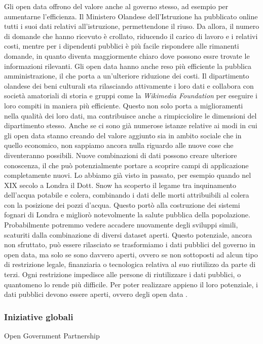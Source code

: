 Gli open data offrono del valore anche al governo stesso, ad esempio per aumentarne l'efficienza. Il Ministero Olandese dell'Istruzione ha pubblicato online tutti i suoi dati relativi all'istruzione, permettendone il riuso. Da allora, il numero di domande che hanno ricevuto è crollato, riducendo il carico di lavoro e i relativi costi, mentre per i dipendenti pubblici è più facile rispondere alle rimanenti domande, in quanto diventa maggiormente chiaro dove possono essre trovate le informazioni rilevanti. Gli open data hanno anche reso più efficiente la pubblica amministrazione, il che porta a un'ulteriore riduzione dei costi. Il dipartimento olandese dei beni culturali sta rilasciando attivamente i loro dati e collabora con società amatoriali di storia e gruppi come la \textit{Wikimedia Foundation} per eseguire i loro compiti in maniera più efficiente. Questo non solo porta a miglioramenti nella qualità dei loro dati, ma contribuisce anche a rimpicciolire le dimensioni del dipartimento stesso.
Anche se ci sono già numerose istanze relative ai modi in cui gli open data stanno creando del valore aggiunto sia in ambito sociale che in quello economico, non sappiamo ancora nulla riguardo alle nuove cose che diventeranno possibili. Nuove combinazioni di dati possono creare ulteriore conoscenza, il che può potenzialmente portare a scoprire campi di applicazione completamente nuovi. Lo abbiamo già visto in passato, per esempio quando nel XIX secolo a Londra il Dott. Snow ha scoperto il legame tra inquinamento dell'acqua potabile e colera, combinando i dati delle morti attribuibili al colera con la posizione dei pozzi d'acqua. Questo portò alla costruzione dei sistemi fognari di Londra e migliorò notevolmente la salute pubblica della popolazione. Probabilmente potremmo vedere accadere nuovamente degli sviluppi simili, scaturiti dalla combinazione di diversi dataset aperti. Questo potenziale, ancora non sfruttato, può essere rilasciato se trasformiamo i dati pubblici del governo in open data, ma solo se sono davvero aperti, ovvero se non sottoposti ad alcun tipo di restrizione legale, finanziaria o tecnologica relativa al suo riutilizzo da parte di terzi. Ogni restrizione impedisce alle persone di riutilizzare i dati pubblici, o quantomeno lo rende più difficile. Per poter realizzare appieno il loro potenziale, i dati pubblici devono essere aperti, ovvero degli open data \cite{OpenDataHandbook_WhyOpenData}.

\subsubsection{Iniziative globali}
Open Government Partnership

